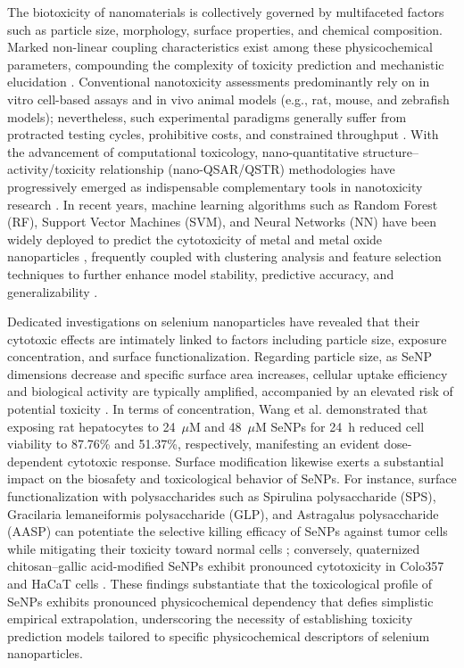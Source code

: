 \documentclass[letterpaper]{article}
\begin{document}
The biotoxicity of nanomaterials is collectively governed by multifaceted factors such as particle size, morphology, surface properties, and chemical composition. Marked non-linear coupling characteristics exist among these physicochemical parameters, compounding the complexity of toxicity prediction and mechanistic elucidation \cite{ji2025rosml}. Conventional nanotoxicity assessments predominantly rely on in vitro cell-based assays and in vivo animal models (e.g., rat, mouse, and zebrafish models); nevertheless, such experimental paradigms generally suffer from protracted testing cycles, prohibitive costs, and constrained throughput \cite{ahmadi2024toxicity}. With the advancement of computational toxicology, nano-quantitative structure--activity/toxicity relationship (nano-QSAR/QSTR) methodologies have progressively emerged as indispensable complementary tools in nanotoxicity research \cite{roy2023tio2}. In recent years, machine learning algorithms such as Random Forest (RF), Support Vector Machines (SVM), and Neural Networks (NN) have been widely deployed to predict the cytotoxicity of metal and metal oxide nanoparticles \cite{zhang2023qsar}, frequently coupled with clustering analysis and feature selection techniques to further enhance model stability, predictive accuracy, and generalizability \cite{sang2022mlcytotoxicity}.

Dedicated investigations on selenium nanoparticles have revealed that their cytotoxic effects are intimately linked to factors including particle size, exposure concentration, and surface functionalization. Regarding particle size, as SeNP dimensions decrease and specific surface area increases, cellular uptake efficiency and biological activity are typically amplified, accompanied by an elevated risk of potential toxicity \cite{zhang2023senpsbio}. In terms of concentration, Wang et al. \cite{wang2020prooxidation} demonstrated that exposing rat hepatocytes to 24~$\mu$M and 48~$\mu$M SeNPs for 24~h reduced cell viability to 87.76\% and 51.37\%, respectively, manifesting an evident dose-dependent cytotoxic response. Surface modification likewise exerts a substantial impact on the biosafety and toxicological behavior of SeNPs. For instance, surface functionalization with polysaccharides such as Spirulina polysaccharide (SPS), Gracilaria lemaneiformis polysaccharide (GLP), and Astragalus polysaccharide (AASP) can potentiate the selective killing efficacy of SeNPs against tumor cells while mitigating their toxicity toward normal cells \cite{zhang2023senpsbio,ji2023astragalus}; conversely, quaternized chitosan--gallic acid-modified SeNPs exhibit pronounced cytotoxicity in Colo357 and HaCaT cells \cite{lunkov2023chitosan}. These findings substantiate that the toxicological profile of SeNPs exhibits pronounced physicochemical dependency that defies simplistic empirical extrapolation, underscoring the necessity of establishing toxicity prediction models tailored to specific physicochemical descriptors of selenium nanoparticles.
\end{document}
